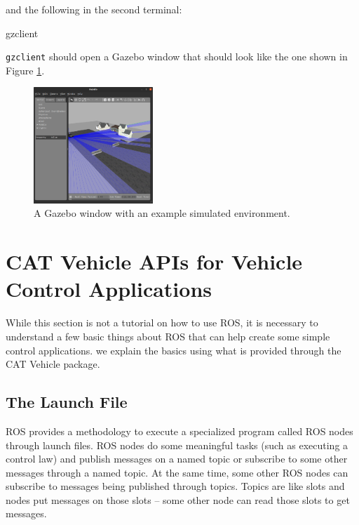 \documentclass[
]{article}
\newenvironment{Shaded}{\begin{snugshade}}{\end{snugshade}}
\newcommand{\ExtensionTok}[1]{#1}
\begin{document}
and the following in the second terminal:

\begin{Shaded}
\begin{Highlighting}[]
\ExtensionTok{gzclient}
\end{Highlighting}
\end{Shaded}

\texttt{gzclient} should open a Gazebo window that should look like the
one shown in Figure \ref{fig:Gazebo_001.png}.

\begin{figure}[htbp]
\centering
\includegraphics[width=0.4\textwidth]{Gazebo_001.png}
\caption{A Gazebo window with an example simulated environment.}
\label{fig:Gazebo_001.png}
\end{figure}

\hypertarget{cat-vehicle-apis-for-vehicle-control-applications}{%
\section{CAT Vehicle APIs for Vehicle Control
Applications}\label{cat-vehicle-apis-for-vehicle-control-applications}}

\label{sec:API} While this section is not a tutorial on how to use ROS,
it is necessary to understand a few basic things about ROS that can help
create some simple control applications. we explain the basics using
what is provided through the CAT Vehicle package.

\hypertarget{the-launch-file}{%
\subsection{The Launch File}\label{the-launch-file}}

ROS provides a methodology to execute a specialized program called ROS
nodes through launch files. ROS nodes do some meaningful tasks (such as
executing a control law) and publish messages on a named topic or
subscribe to some other messages through a named topic. At the same
time, some other ROS nodes can subscribe to messages being published
through topics. Topics are like slots and nodes put messages on those
slots -- some other node can read those slots to get messages.
\end{document}
